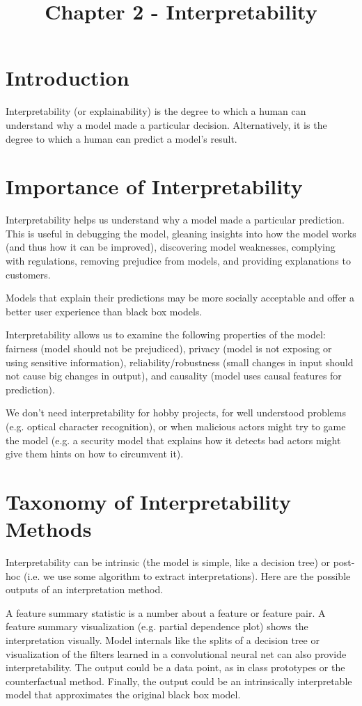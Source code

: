 \documentclass[a4paper]{article}
\title{Chapter 2 - Interpretability}
\date{}
\begin{document}
\maketitle

\section{Introduction}
Interpretability (or explainability) is the degree to which a human can understand
why a model made a particular decision. Alternatively, it is the degree to which
a human can predict a model's result.

\section{Importance of Interpretability}
Interpretability helps us understand why a model made a particular prediction.
This is useful in debugging the model, gleaning insights into how the model
works (and thus how it can be improved), discovering model weaknesses, complying
with regulations, removing prejudice from models, and providing explanations to
customers.

Models that explain their predictions may be more socially acceptable and offer
a better user experience than black box models.

Interpretability allows us to examine the following properties of the model:
fairness (model should not be prejudiced), privacy (model is not exposing
or using sensitive information), reliability/robustness (small changes in
input should not cause big changes in output), and causality (model uses causal
features for prediction).

We don't need interpretability for hobby projects, for well understood
problems (e.g. optical character recognition), or when malicious actors might
try to game the model (e.g. a security model that explains how it detects bad
actors might give them hints on how to circumvent it).

\section{Taxonomy of Interpretability Methods}
Interpretability can be intrinsic (the model is simple, like a decision tree)
or post-hoc (i.e. we use some algorithm to extract interpretations). Here are
the possible outputs of an interpretation method.

A feature summary statistic is a number about a feature or feature pair. A
feature summary visualization (e.g. partial dependence plot) shows the
interpretation visually. Model internals like the splits of a decision tree or
visualization of the filters learned in a convolutional neural net can also
provide interpretability. The output could be a data point, as in class
prototypes or the counterfactual method. Finally, the output could be an
intrinsically interpretable model that approximates the original black box
model.
\end{document}
